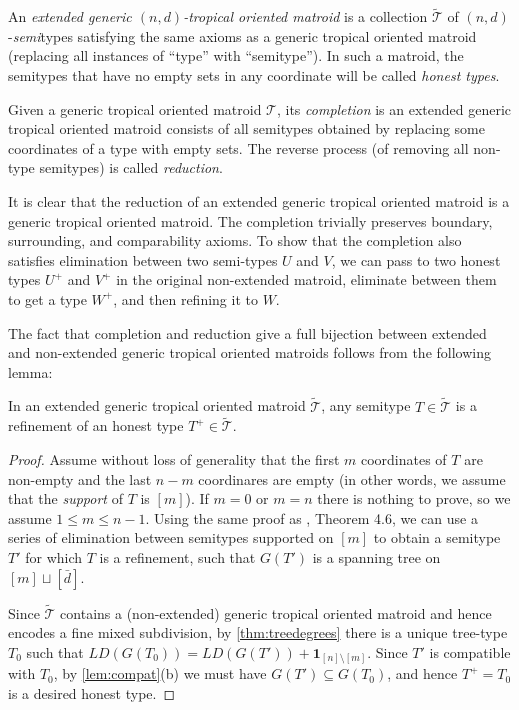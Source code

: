 \documentclass[letterpaper,reqno,11pt]{amsart}
\begin{document}
\begin{definition}
    An \emph{extended generic $(n, d)$-tropical oriented matroid} is a collection $\tilde{\mathcal{T}}$ of $(n,d)$-\emph{semi}types satisfying the same axioms as a generic tropical oriented matroid (replacing all instances of ``type'' with ``semitype''). In such a matroid, the semitypes that have no empty sets in any coordinate will be called \emph{honest types}.

    Given a generic tropical oriented matroid $\mathcal{T}$, its \emph{completion} is an extended generic tropical oriented matroid consists of all semitypes obtained by replacing some coordinates of a type with empty sets. The reverse process (of removing all non-type semitypes) is called \emph{reduction}.
\end{definition}

\begin{remark}
    It is clear that the reduction of an extended generic tropical oriented matroid is a generic tropical oriented matroid. The completion trivially preserves boundary, surrounding, and comparability axioms. To show that the completion also satisfies elimination between two semi-types $U$ and $V$, we can pass to two honest types $U^+$ and $V^+$ in the original non-extended matroid, eliminate between them to get a type $W^+$, and then refining it to $W$.
\end{remark}

The fact that completion and reduction give a full bijection between extended and non-extended generic tropical oriented matroids follows from the following lemma:

\begin{lemma}\label{lem:refinehonest}
    In an extended generic tropical oriented matroid $\tilde{\mathcal{T}}$, any semitype $T\in \tilde{\mathcal{T}}$ is a refinement of an honest type $T^+\in \tilde{\mathcal{T}}$. 
\end{lemma}

\begin{proof}
    Assume without loss of generality that the first $m$ coordinates of $T$ are non-empty and the last $n-m$ coordinares are empty (in other words, we assume that the \emph{support} of $T$ is $[m]$). If $m = 0$ or $m = n$ there is nothing to prove, so we assume $1\leq m \leq n-1$. Using the same proof as \cite{TropicalOM}, Theorem 4.6, we can use a series of elimination between semitypes supported on $[m]$ to obtain a semitype $T'$ for which $T$ is a refinement, such that $G(T')$ is a spanning tree on $[m]\sqcup [\bar{d}]$. 

    Since $\tilde{\mathcal{T}}$ contains a (non-extended) generic tropical oriented matroid and hence encodes a fine mixed subdivision, by \cref{thm:treedegrees} there is a unique tree-type $T_0$ such that $LD(G(T_0)) = LD(G(T')) + \mathbf{1}_{[n]\setminus[m]}$. Since $T'$ is compatible with $T_0$, by \cref{lem:compat}(b) we must have $G(T')\subseteq G(T_0)$, and hence $T^+ = T_0$ is a desired honest type.
\end{proof}
\end{document}
